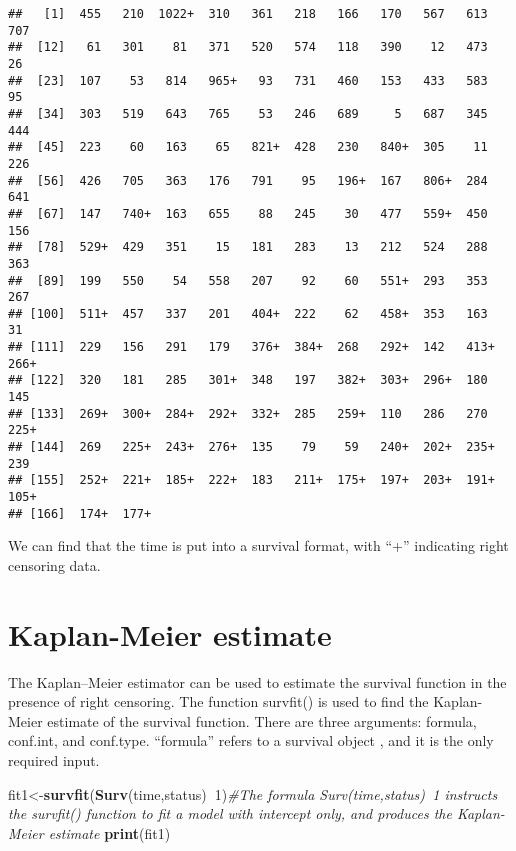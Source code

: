\documentclass[]{book}
\newenvironment{Shaded}{\begin{snugshade}}{\end{snugshade}}
\newcommand{\KeywordTok}[1]{\textcolor[rgb]{0.13,0.29,0.53}{\textbf{#1}}}
\newcommand{\DecValTok}[1]{\textcolor[rgb]{0.00,0.00,0.81}{#1}}
\newcommand{\CommentTok}[1]{\textcolor[rgb]{0.56,0.35,0.01}{\textit{#1}}}
\newcommand{\OperatorTok}[1]{\textcolor[rgb]{0.81,0.36,0.00}{\textbf{#1}}}
\newcommand{\NormalTok}[1]{#1}
\theoremstyle{definition}
\theoremstyle{definition}
\theoremstyle{definition}
\theoremstyle{remark}
\begin{document}
\begin{verbatim}
##   [1]  455   210  1022+  310   361   218   166   170   567   613   707 
##  [12]   61   301    81   371   520   574   118   390    12   473    26 
##  [23]  107    53   814   965+   93   731   460   153   433   583    95 
##  [34]  303   519   643   765    53   246   689     5   687   345   444 
##  [45]  223    60   163    65   821+  428   230   840+  305    11   226 
##  [56]  426   705   363   176   791    95   196+  167   806+  284   641 
##  [67]  147   740+  163   655    88   245    30   477   559+  450   156 
##  [78]  529+  429   351    15   181   283    13   212   524   288   363 
##  [89]  199   550    54   558   207    92    60   551+  293   353   267 
## [100]  511+  457   337   201   404+  222    62   458+  353   163    31 
## [111]  229   156   291   179   376+  384+  268   292+  142   413+  266+
## [122]  320   181   285   301+  348   197   382+  303+  296+  180   145 
## [133]  269+  300+  284+  292+  332+  285   259+  110   286   270   225+
## [144]  269   225+  243+  276+  135    79    59   240+  202+  235+  239 
## [155]  252+  221+  185+  222+  183   211+  175+  197+  203+  191+  105+
## [166]  174+  177+
\end{verbatim}

We can find that the time is put into a survival format, with ``+''
indicating right censoring data.

\section{Kaplan-Meier estimate}\label{kaplan-meier-estimate}

The Kaplan--Meier estimator can be used to estimate the survival
function in the presence of right censoring. The function survfit() is
used to find the Kaplan-Meier estimate of the survival function. There
are three arguments: formula, conf.int, and conf.type. ``formula''
refers to a survival object , and it is the only required input.

\begin{Shaded}
\begin{Highlighting}[]
\NormalTok{fit1<-}\KeywordTok{survfit}\NormalTok{(}\KeywordTok{Surv}\NormalTok{(time,status)}\OperatorTok{~}\DecValTok{1}\NormalTok{)}\CommentTok{#The formula Surv(time,status)~1 instructs the survfit() function to fit a model with intercept only, and produces the Kaplan-Meier estimate}
\KeywordTok{print}\NormalTok{(fit1)}
\end{Highlighting}
\end{Shaded}
\end{document}

